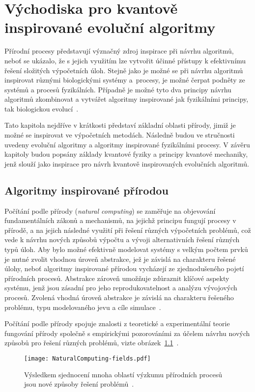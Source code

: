\chapter{Východiska pro kvantově inspirované evoluční algoritmy}
Přírodní procesy představují význačný zdroj inspirace při návrhu algoritmů, neboť se ukázalo, že s jejich využitím lze vytvořit účinné přístupy k efektivnímu řešení složitých výpočetních úloh.
Stejně jako je možné se při návrhu algoritmů inspirovat různými biologickými systémy a~procesy, je možné čerpat podněty ze systémů a procesů fyzikálních. 
Případně je možné tyto dva principy návrhu algoritmů zkombinovat a vytvářet algoritmy inspirované jak fyzikálními principy, tak biologickou evolucí~\cite{NaturalComputing,NaturalComputing-handbook}.

Tato kapitola nejdříve v krátkosti představí základní oblasti přírody, jimiž je možné se inspirovat ve výpočetních metodách. 
Následně budou ve stručnosti uvedeny evoluční algoritmy a algoritmy inspirované fyzikálními procesy. 
V závěru kapitoly budou popsány základy kvantové fyziky a principy kvantové mechaniky, jenž slouží jako inspirace pro návrh kvantově inspirovaných evolučních algoritmů. 

\section{Algoritmy inspirované přírodou}
Počítání podle přírody (\emph{natural computing}) se zaměřuje na objevování fundamentálních zákonů a mechanismů, na jejichž principu fungují procesy v přírodě, a na jejich následné využití při řešení různých výpočetních problémů, což vede k návrhu nových způsobů výpočtu a vývoji alternativních řešení různých typů úloh. 
Aby bylo možné efektivně modelovat systémy s velkým počtem prvků je nutné zvolit vhodnou úroveň abstrakce, jež je závislá na charakteru řešené úlohy, neboť algoritmy inspirované přírodou vycházejí ze zjednodušeného pojetí přírodních procesů. 
Abstrakce zároveň umožňuje zdůraznit klíčové aspekty systému, jenž jsou zásadní pro jeho reprodukovatelnost a analýzu vývojových procesů. 
Zvolená vhodná úroveň abstrakce je závislá na charakteru řešeného problému, typu modelovaného jevu a cíle simulace~\cite{FundamentalNatural}. 

Počítání podle přírody spojuje znalosti z teoretické a experimentální teorie fungování přírody společně s empirickými pozorováními za účelem návrhu nových způsobů pro řešení různých problémů, vizte obrázek~\ref{fig:natural-computing-fields}~\cite{FundamentalNatural}.
\begin{figure}[ht!]
    \centering
    \texttt{[image: NaturalComputing-fields.pdf]}
    \caption{Výsledkem sjednocení mnoha oblastí výzkumu přírodních procesů jsou nové způsoby řešení problémů~\cite{FundamentalNatural}.}
    \label{fig:natural-computing-fields}
\end{figure}

